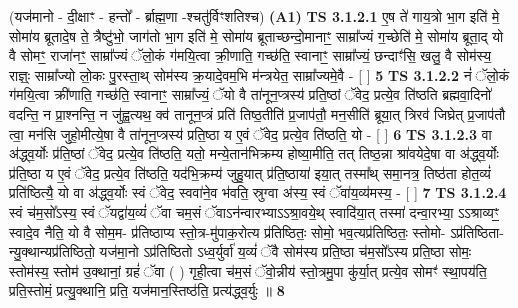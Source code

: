 \documentclass[17pt]{extarticle}
\begin{document}
                      (यज॑मानो - दी॒क्षाꣳ - हन्तो᳚ - र्ब्राह्म॒णा -श्चतु॑र्विꣳशतिश्च)  \textbf{(A1)} \newline \newline
                                        \textbf{ TS 3.1.2.1} \newline
                  ए॒ष ते॑ गाय॒त्रो भा॒ग इति॑ मे॒ सोमा॑य ब्रूतादे॒ष ते॒ त्रैष्टु॑भो॒ जाग॑तो भा॒ग इति॑ मे॒ सोमा॑य ब्रूताच्छन्दो॒मानाꣳ॒॒ साम्रा᳚ज्यं ग॒च्छेति॑ मे॒ सोमा॑य ब्रूता॒द् यो वै सोमꣳ॒॒ राजा॑नꣳ॒॒ साम्रा᳚ज्यं ॅलो॒कं ग॑मयि॒त्वा क्री॒णाति॒ गच्छ॑ति॒ स्वानाꣳ॒॒ साम्रा᳚ज्यं॒ छन्दाꣳ॑सि॒ खलु॒ वै सोम॑स्य॒ राज्ञ्ः॒ साम्रा᳚ज्यो लो॒कः पु॒रस्ता॒थ् सोम॑स्य क्र॒यादे॒वम॒भि म॑न्त्रयेत॒ साम्रा᳚ज्यमे॒वै - [  ] \textbf{  5} \newline
                  \newline
                                \textbf{ TS 3.1.2.2} \newline
                  नं॑ ॅलो॒कं ग॑मयि॒त्वा क्री॑णाति॒ गच्छ॑ति॒ स्वानाꣳ॒॒ साम्रा᳚ज्यं॒ ॅयो वै ता॑नून॒प्त्रस्य॑ प्रति॒ष्ठां ॅवेद॒ प्रत्ये॒व ति॑ष्ठति ब्रह्मवा॒दिनो॑ वदन्ति॒ न प्रा॒श्नन्ति॒ न जु॑ह्व॒त्यथ॒ क्व॑ तानून॒प्त्रं प्रति॑ तिष्ठ॒तीति॑ प्र॒जाप॑तौ॒ मन॒सीति॑ ब्रूया॒त् त्रिरव॑ जिघ्रेत् प्र॒जाप॑तौ त्वा॒ मन॑सि जुहो॒मीत्ये॒षा वै ता॑नून॒प्त्रस्य॑ प्रति॒ष्ठा य ए॒वं ॅवेद॒ प्रत्ये॒व ति॑ष्ठति॒ यो - [  ] \textbf{  6} \newline
                  \newline
                                \textbf{ TS 3.1.2.3} \newline
                  वा अ॑द्ध्व॒र्योः प्र॑ति॒ष्ठां ॅवेद॒ प्रत्ये॒व ति॑ष्ठति॒ यतो॒ मन्ये॒तान॑भिक्रम्य होष्या॒मीति॒ तत् तिष्ठ॒न्ना श्रा॑वयेदे॒षा वा अ॑द्ध्व॒र्योः प्र॑ति॒ष्ठा य ए॒वं ॅवेद॒ प्रत्ये॒व ति॑ष्ठति॒ यद॑भि॒क्रम्य॑ जुहु॒यात् प्र॑ति॒ष्ठाया॑ इया॒त् तस्मा᳚थ् समा॒नत्र॒ तिष्ठ॑ता होत॒व्यं॑ प्रति॑ष्ठित्यै॒ यो वा अ॑द्ध्व॒र्योः स्वं ॅवेद॒ स्ववा॑ने॒व भ॑वति॒ स्रुग्वा अ॑स्य॒ स्वं ॅवा॑य॒व्य॑मस्य॒ - [  ] \textbf{  7} \newline
                  \newline
                                \textbf{ TS 3.1.2.4} \newline
                  स्वं च॑म॒सो᳚ऽस्य॒ स्वं ॅयद्वा॑य॒व्यं॑ ॅवा चम॒सं ॅवाऽन॑न्वारभ्याऽऽश्रा॒वये॒थ् स्वादि॑या॒त् तस्मा॑ दन्वा॒रभ्या॒ ऽऽश्राव्यꣳ॒॒ स्वादे॒व नैति॒ यो वै सोम॒म- प्र॑तिष्ठाप्य स्तो॒त्र-मु॑पाक॒रोत्य प्र॑तिष्ठितः॒ सोमो॒ भव॒त्यप्र॑तिष्ठितः॒ स्तोमो- ऽप्र॑तिष्ठिता-न्यु॒क्थान्यप्र॑तिष्ठितो॒ यज॑मा॒नो ऽप्र॑तिष्ठितो ऽध्व॒र्युर्वा॑ य॒व्यं॑ ॅवै सोम॑स्य प्रति॒ष्ठा च॑म॒सो᳚ऽस्य प्रति॒ष्ठा सोमः॒ स्तोम॑स्य॒ स्तोम॑ उ॒क्थानां॒ ग्रहं॑ ॅवा ( ) गृही॒त्वा च॑म॒सं ॅवो॒न्नीय॑ स्तो॒त्रमु॒पा कु॑र्या॒त् प्रत्ये॒व सोमꣳ॑ स्था॒पय॑ति॒ प्रति॒स्तोमं॒ प्रत्यु॒क्थानि॒ प्रति॒ यज॑मान॒स्तिष्ठ॑ति॒ प्रत्य॑द्ध्व॒र्युः ॥ \textbf{  8 } \newline
\end{document}
